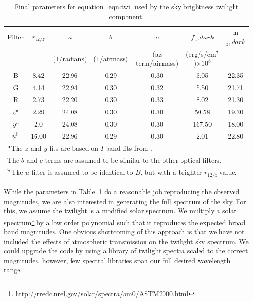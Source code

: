 \documentclass[]{spie}
\begin{document}
\begin{table}
\caption{Final parameters for equation~\ref{eqn:twi} used by the sky brightness twilight component. 
\label{table:canonFits}}
\begin{center}
\begin{tabular}{c c c c c c c}
  Filter & $r_{12/z}$ & $a$  & $b$  & $c$  & $f_z,dark$ & m$_z,dark$ \\
  & & (1/radians) & (1/airmass) & (az term/airmass) & (erg/s/cm$^2$)$\times 10^8$ \\
  \hline
  \hline
  B  & 8.42 & 22.96 & 0.29 & 0.30 & 3.05  &  22.35 \\
  G  & 4.14 & 22.94 & 0.30 & 0.32 & 5.50  &  21.71 \\
  R  & 2.73 & 22.20 & 0.30 & 0.33 & 8.02  &  21.30 \\
  $z^{\rm{a}}$ & 2.29 & 24.08 & 0.30 & 0.30 & 50.58  &  19.30 \\
  $y^{\rm{a}}$  & 2.0 & 24.08 & 0.30 & 0.30 & 167.50  &  18.00 \\
  $u^{\rm{b}}$  & 16.00 & 22.96 & 0.29 & 0.30 & 2.01  &  22.80\\
 \hline
 \multicolumn{7}{l}{$^{\rm{a}}$The $z$ and $y$ fits are based on $I$-band fits from \cite{Patat06}.} \\
 \multicolumn{7}{l}{The $b$ and $c$ terms are assumed to be similar to the other optical filters.} \\
 \multicolumn{7}{l}{$^{\rm{b}}$The $u$ filter is assumed to be identical to $B$, but with a brighter $r_{12/z}$ value.}
 \end{tabular}
 \end{center}
\end{table}


While the parameters in Table~\ref{table:canonFits} do a reasonable job reproducing the observed magnitudes, we are also interested in generating the full spectrum of the sky.  For this, we assume the twilight is a modified solar spectrum.  We multiply a solar spectrum\footnote{\url{http://rredc.nrel.gov/solar/spectra/am0/ASTM2000.html}} by a low order polynomial such that it reproduces the expected broad band magnitudes.  One obvious shortcoming of this approach is that we have not included the effects of atmospheric transmission on the twilight sky spectrum. We could upgrade the code by using a library of twilight spectra scaled to the correct magnitudes, however, few spectral libraries span our full desired wavelength range.
\end{document}

